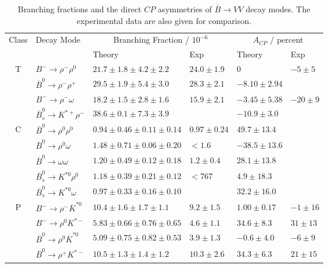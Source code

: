 \documentclass[11pt]{article}
\begin{document}
\begin{table}%
\begin{center}
\caption{Branching fractions and the direct $CP$ asymmetries of  $\overline B \to VV$ decay modes.  The  experimental data \cite{Agashe:2014kda} are also given for comparison. }\label{Tab:br}
\renewcommand*{\arraystretch}{0.8}
\begin{tabular}{c|l| l |l|l| l }
\hline
\hline
 \multirow{2}{*}{Class} & \multirow{2}{*}{Decay Mode} &
 \multicolumn{2}{c|}{Branching Fraction / $10^{-6}$} &
 \multicolumn{2}{c}{$A_{CP}$ / percent} \\
 \cline{3-6}
&  & Theory  & Exp & Theory    & Exp \\
 \hline
 \multirow{4}{*}{T}& $B^-\to\rho^-\rho^0$                & $21.7\pm1.8\pm4.2\pm2.2$    & $24.0\pm 1.9$  & $0$ & $-5\pm5$ \\
&$\overline B^0\to\rho^-\rho^+$      & $29.5\pm1.9\pm5.4\pm3.0$    & $28.3\pm 2.1$  & $-8.10\pm2.94$   \\
&$B^-\to\rho^-\omega$                & $18.2\pm1.5\pm2.8\pm1.6$    & $15.9\pm 2.1$  & $-3.45\pm5.38$ & $-20\pm9$ \\
&$\overline B_s^0\to K^{*+}\rho^-$  & $38.6\pm0.1\pm7.3\pm3.9$ & $ $       & $-10.9\pm3.0$ & $ $ \\
\hline
 \multirow{5}{*}{C}&$\overline B^0\to\rho^0\rho^0$      & $0.94\pm0.46\pm0.11\pm0.14$ & $0.97\pm 0.24$ & $49.7\pm13.4$   \\
&$\overline B^0\to\rho^0\omega$      & $1.48\pm0.71\pm0.06\pm0.20$ & $<1.6$         & $-38.5\pm13.6$  \\
&$\overline B^0\to\omega\omega$      & $1.20\pm0.49\pm0.12\pm0.18$ & $1.2\pm0.4$    & $28.1\pm13.8$ & $ $ \\
&$\overline B_s^0\to K^{*0}\rho^0$  & $1.18\pm0.39\pm0.21\pm0.12$ & $<767$ & $4.9\pm18.3$ & $ $ \\
&$\overline B_s^0\to K^{*0}\omega$  & $0.97\pm0.33\pm0.16\pm0.10$ & $ $    & $32.2\pm16.0$ & $ $ \\
\hline
 \multirow{11}{*}{P}&$B^-\to\rho^-\overline K^{*0}$              & $10.4\pm1.6\pm1.7\pm1.1$ & $9.2\pm1.5$  & $1.00\pm0.17$ & $-1\pm16$ \\
&$B^-\to\rho^0 K^{*-}$                       & $5.83\pm0.66\pm0.76\pm0.65$ & $4.6\pm1.1$  & $34.6\pm8.3$       &$31\pm13$ \\
&$\overline B^0\to\rho^0\overline K^{*0}$    & $5.09\pm0.75\pm0.82\pm0.53$     & $3.9\pm1.3$  & $-0.6\pm4.0$ & $-6\pm9$ \\
&$\overline B^0\to\rho^+ K^{*-}$             & $10.5\pm1.3\pm1.4\pm1.2$ & $10.3\pm2.6$ & $34.3\pm6.3$ & $21\pm15$ \\

\end{tabular}
\end{center}
\end{table}
\end{document}
